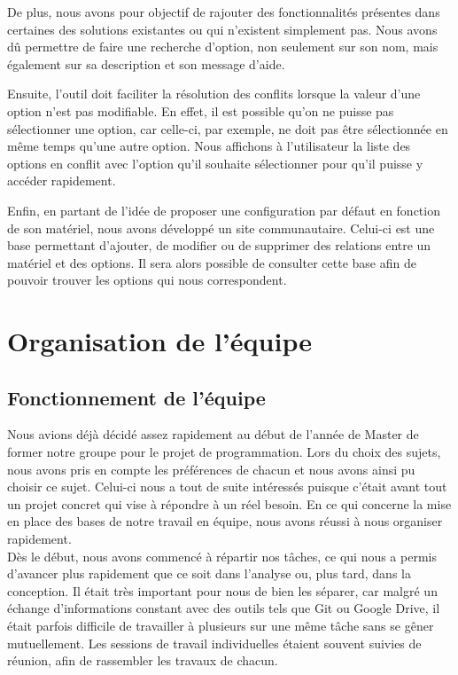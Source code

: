\documentclass[16pts]{report}
\begin{document}
De plus, nous avons pour objectif de rajouter des fonctionnalités présentes 
dans certaines des solutions existantes ou qui n'existent simplement pas. 
Nous avons dû permettre de faire une recherche d'option, non seulement 
sur son nom, mais également sur sa description et son message d'aide.

Ensuite, l'outil doit faciliter la résolution des conflits lorsque la 
valeur d'une option n'est pas modifiable. En effet, il est possible qu'on 
ne puisse pas sélectionner une option, car celle-ci, par exemple, ne doit 
pas être sélectionnée en même temps qu'une autre option. Nous affichons 
à l'utilisateur la liste des options en conflit avec l'option qu'il 
souhaite sélectionner pour qu'il puisse y accéder rapidement.

Enfin, en partant de l'idée de proposer une configuration par défaut en 
fonction de son matériel, nous avons développé un site communautaire. 
Celui-ci est une base permettant d'ajouter, de modifier ou de supprimer 
des relations entre un matériel et des options. Il sera alors possible de 
consulter cette base afin de pouvoir trouver les options qui nous 
correspondent.


\chapter{Organisation de l'équipe}
\label{cha:Organisation de l'équipe}
    \section{Fonctionnement de l'équipe}
    \label{sec:Fonctionnement de l'équipe}

Nous avions déjà décidé assez rapidement au début de l'année de Master 
de former notre groupe pour le projet de programmation. Lors du choix 
des sujets, nous avons pris en compte les préférences de chacun et nous 
avons ainsi pu choisir ce sujet. Celui-ci nous a tout de suite intéressés 
puisque c'était avant tout un projet concret qui vise à répondre à un 
réel besoin.
En ce qui concerne la mise en place des bases de notre travail en 
équipe, nous avons réussi à nous organiser rapidement. 
\\
Dès le début, nous avons commencé à répartir nos tâches, ce qui nous a 
permis d’avancer plus rapidement que ce soit dans l’analyse ou, plus tard, 
dans la conception. Il était très important pour nous de bien les séparer, 
car malgré un échange d’informations constant avec des outils tels que 
Git ou Google Drive, il était parfois difficile de travailler à plusieurs 
sur une même tâche sans se gêner mutuellement. Les sessions de travail 
individuelles étaient souvent suivies de réunion, afin de rassembler 
les travaux de chacun.
\\
\end{document}
